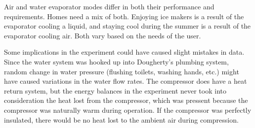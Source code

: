 \documentclass{article}
\begin{document}
Air and water evaporator modes differ in both their performance and requirements. Homes need a mix of both. Enjoying ice makers is a result of the evaporator cooling a liquid, and staying cool during the summer is a result of the evaporator cooling air. Both vary based on the needs of the user. 

Some implications in the experiment could have caused slight mistakes in data. Since the water system was hooked up into Dougherty's plumbing system, random change in water pressure (flushing toilets, washing hands, etc.) might have caused variations in the water flow rates. The compressor does have a heat return system, but the energy balances in the experiment never took into consideration the heat lost from the compressor, which was pressent because the compressor was naturally warm during operation. If the compressor was perfectly insulated, there would be no heat lost to the ambient air during compression. 

\end{document}

